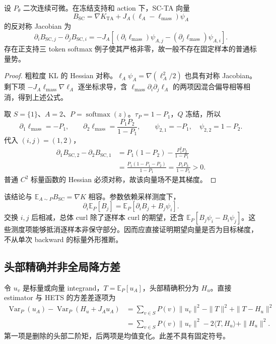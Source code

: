 \documentclass[lang=cn,scheme=chinese,openany]{../book/elegantbook}
\newcommand{\E}{\mathbb E}
\newcommand{\Var}{\operatorname{Var}}
\begin{document}
\begin{proposition}[SC-TA 的固定样本场一般非保守]
\label{est:sc-curl}
设 $P_\theta$ 二次连续可微。在冻结支持和 action 下，SC-TA 向量
\begin{equation}
B_{\mathrm{SC}}=\nabla K_{\mathrm{TA}}+J_A(\ell_A-\ell_{\mathrm{mass}})\psi_A
\end{equation}
的反对称 Jacobian 为
\begin{equation}
\partial_iB_{\mathrm{SC},j}-\partial_jB_{\mathrm{SC},i}
=-J_A\left[(\partial_i\ell_{\mathrm{mass}})\psi_{A,j}
-(\partial_j\ell_{\mathrm{mass}})\psi_{A,i}\right].
\end{equation}
存在正支持三 token softmax 例子使其严格非零，故一般不存在固定样本的普通标量势。
\end{proposition}
\begin{proof}
粗粒度 KL 的 Hessian 对称。$\ell_A\psi_A=\nabla(\ell_A^2/2)$ 也具有对称 Jacobian。剩下项 $-J_A\ell_{\mathrm{mass}}\nabla\ell_A$ 逐坐标求导，含 $\ell_{\mathrm{mass}}\partial_i\partial_j\ell_A$ 的两项因混合偏导相等相消，得到上述公式。

取 $S=\{1\}$、$A=2$、$P=\operatorname{softmax}(z)$。$\tau_P=1-P_1$，$Q$ 冻结，所以
\begin{equation}
\partial_1\ell_{\mathrm{mass}}=-P_1,\qquad
\partial_2\ell_{\mathrm{mass}}=\frac{P_1P_2}{1-P_1},\qquad
\psi_{2,1}=-P_1,\quad\psi_{2,2}=1-P_2.
\end{equation}
代入 $(i,j)=(1,2)$，
\begin{align}
\partial_1B_{\mathrm{SC},2}-\partial_2B_{\mathrm{SC},1}
&=P_1(1-P_2)-\frac{P_1^2P_2}{1-P_1}\\
&=\frac{P_1(1-P_1-P_2)}{1-P_1}
=\frac{P_1P_3}{1-P_1}>0.
\end{align}
普通 $C^2$ 标量函数的 Hessian 必须对称，故该向量场不是其梯度。
\end{proof}

该结论与 $\E_{A\sim P}B_{\mathrm{SC}}=\nabla K$ 相容。参数依赖采样测度下，
\begin{equation}
\partial_i\E_P[B_j]=\E_P[\partial_iB_j+B_j\psi_i].
\end{equation}
交换 $i,j$ 后相减，总体 curl 除了逐样本 curl 的期望，还含 $\E_P[B_j\psi_i-B_i\psi_j]$。这些测度项能够抵消逐样本非保守部分。因而应直接证明期望向量是否为目标梯度，不从单次 backward 的标量外形推断。

\subsection{头部精确并非全局降方差}
\label{est:hets-counterexamples}
令 $u_v$ 是标量或向量 integrand，$T=\E_P[u_A]$，头部精确积分为 $H_u$。直接 estimator 与 HETS 的方差差逐项为
\begin{align}
\Var_P(u_A)-\Var_P(H_u+J_Au_A)
&=\sum_{v\in S}P(v)\|u_v\|^2-\|T\|^2+\|T-H_u\|^2\\
&=\sum_{v\in S}P(v)\|u_v\|^2-2\langle T,H_u\rangle+\|H_u\|^2.
\end{align}
第一项是删除的头部二阶矩，后两项是均值变化。此差不具有固定符号。
\end{document}
